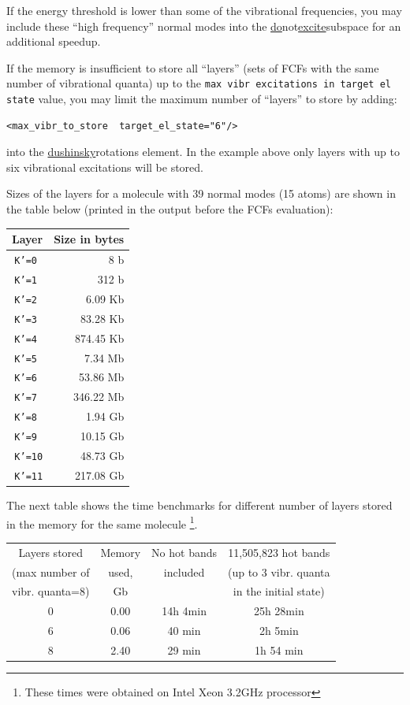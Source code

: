 \documentclass[11pt]{article}
\begin{document}
If the energy threshold is lower than some of the vibrational frequencies, 
you may include these ``high frequency'' normal modes
into the \ul{do}{not}\ul{excite}{subspace} for an additional speedup.

If the memory is insufficient to store all ``layers'' (sets of FCFs with the same number of vibrational quanta)
up to the {\tt max vibr excitations in target el state} value, you may limit the maximum number of ``layers'' to store 
by adding:
\begin{lstlisting}[frame=single,framerule=0pt]
  <max_vibr_to_store  target_el_state="6"/>
\end{lstlisting}
into the \ul{dushinsky}{rotations} element.
In the example above only layers with up to six vibrational excitations will be stored.

Sizes of the layers for a molecule with 39 normal modes (15 atoms) are shown in the table below 
(printed in the output before the FCFs evaluation):

\begin{center}
\begin{tabular}{rr}
\hline
 Layer & Size in bytes \\
\hline
  {\tt  K'=0 }  & 8 b \\
  {\tt  K'=1 }  & 312 b \\
  {\tt  K'=2 }  & 6.09 Kb \\
  {\tt  K'=3 }  & 83.28 Kb \\
  {\tt  K'=4 }  & 874.45 Kb \\
  {\tt  K'=5 }  & 7.34 Mb \\
  {\tt  K'=6 }  & 53.86 Mb \\
  {\tt  K'=7 }  & 346.22 Mb \\
  {\tt  K'=8 }  & 1.94 Gb \\ 
  {\tt  K'=9 }  & 10.15 Gb\\
  {\tt  K'=10}  & 48.73 Gb \\
  {\tt  K'=11}  & 217.08 Gb \\
\hline
\end{tabular}
\end{center}

The next table shows the time benchmarks for different number of layers stored in the memory for the same molecule
\footnote{These times were obtained on Intel Xeon 3.2GHz processor}.

\begin{center}
\begin{tabular}{cccc}
\hline
Layers stored    & Memory & No hot bands& 11,505,823 hot bands \\
(max number of   & used,  & included    & (up to 3 vibr. quanta \\
vibr. quanta=8)  & Gb     &             & in the initial state)\\
\hline
0 & 0.00 & 14h 4min & 25h 28min \\
6 & 0.06 & 40 min   & 2h 5min \\
8 & 2.40 & 29 min   & 1h 54 min \\
\hline
\end{tabular}
\end{center}
\end{document}
